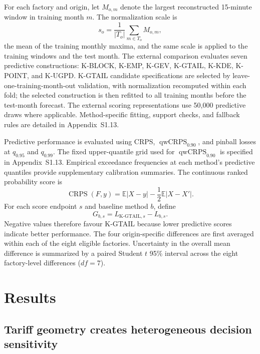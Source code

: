\documentclass[Times1COL]{WileyNJDv5}
\begin{document}
For each factory and origin, let $M_{o,m}$ denote the largest reconstructed 15-minute window in training month $m$. The normalization scale is
\[
s_o=\frac{1}{|T_o|}\sum_{m\in T_o} M_{o,m},
\]
the mean of the training monthly maxima, and the same scale is applied to the training windows and the test month. The external comparison evaluates seven predictive constructions: K-BLOCK, K-EMP, K-GEV, K-GTAIL, K-KDE, K-POINT, and K-UGPD. K-GTAIL candidate specifications are selected by leave-one-training-month-out validation, with normalization recomputed within each fold; the selected construction is then refitted to all training months before the test-month forecast. The external scoring representations use 50,000 predictive draws where applicable. Method-specific fitting, support checks, and fallback rules are detailed in Appendix~S1.13.

Predictive performance is evaluated using CRPS,
$\operatorname{qwCRPS}_{0.90}$, and pinball losses at
$q_{0.95}$ and $q_{0.99}$. The fixed upper-quantile grid used for
$\operatorname{qwCRPS}_{0.90}$ is specified in Appendix~S1.13.
Empirical exceedance frequencies at each method's predictive
quantiles provide supplementary calibration summaries.
The continuous ranked probability score is
\[
\operatorname{CRPS}(F,y)
=
\mathbb{E}|X-y|
-
\frac{1}{2}\mathbb{E}|X-X'|.
\]
For each score endpoint \(s\) and baseline method \(b\), define
\[
G_{b,s}
=
L_{\mathrm{K\text{-}GTAIL},s}
-
L_{b,s}.
\]
Negative values therefore favour K-GTAIL because lower predictive
scores indicate better performance.
The four origin-specific differences are first averaged within each
of the eight eligible factories. Uncertainty in the overall mean
difference is summarized by a paired Student \(t\) 95\% interval
across the eight factory-level differences (\(df=7\)).

\section{Results}
\label{sec:results}

\subsection{Tariff geometry creates heterogeneous decision sensitivity}
\label{sec:results-geometry}
\end{document}
